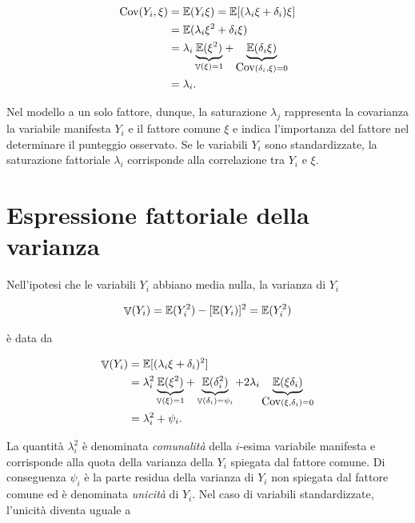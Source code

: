 \documentclass[
  11pt,
]{krantz}
\DeclareMathOperator{\V}{\mathbb{V}} %
\newcommand{\E}{\mathbb{E}} %
\theoremstyle{definition}
\theoremstyle{definition}
\theoremstyle{definition}
\theoremstyle{definition}
\theoremstyle{remark}
\begin{document}
\begin{equation}
\begin{aligned}
  \mbox{Cov}(Y_i,\xi) &= \E(Y_i \xi)=\E[(\lambda_i \xi + \delta_i) \xi]\notag\\
  &=\E(\lambda_i \xi^2 + \delta_i \xi)\notag\\
  &=\lambda_i\underbrace{\E(\xi^2)}_{\V(\xi)=1} + \underbrace{\E(\delta_i \xi)}_{\mbox{Cov}(\delta_i, \xi)=0}\notag\\
  &= \lambda_i.\notag
\end{aligned}
\end{equation}

Nel modello a un solo fattore, dunque, la saturazione \(\lambda_j\) rappresenta la covarianza la variabile manifesta \(Y_i\) e il fattore comune \(\xi\) e indica l'importanza del fattore nel determinare il punteggio osservato. Se le variabili \(Y_i\) sono standardizzate, la saturazione fattoriale \(\lambda_i\) corrisponde alla correlazione tra \(Y_i\) e \(\xi\).

\hypertarget{espressione-fattoriale-della-varianza}{%
\section{Espressione fattoriale della varianza}\label{espressione-fattoriale-della-varianza}}

Nell'ipotesi che le variabili \(Y_i\) abbiano media nulla, la varianza di \(Y_i\)

\begin{equation}
  \V(Y_i) = \E(Y_i^2) -[\E(Y_i)]^2 = \E(Y_i^2)\notag
\end{equation}

è data da

\begin{equation}
\begin{aligned}
  \V(Y_i) &= \E[(\lambda_i \xi + \delta_i)^2 ]\notag\\
  &=\lambda_i^2 \underbrace{\E(\xi^2) }_{\V(\xi)=1} + \underbrace{ \E(\delta_i^2) }_{\V(\delta_i)=\psi_{i}} + 2\lambda_i \underbrace{ \E(\xi \delta_i) }_{\mbox{Cov}(\xi, \delta_{i})=0}\notag\\
  &=\lambda^2_i + \psi_{i}.
\end{aligned}
\end{equation}

La quantità \(\lambda^2_i\) è denominata \emph{comunalità} della \(i\)-esima variabile manifesta e corrisponde alla quota della varianza della \(Y_i\) spiegata dal fattore comune. Di conseguenza \(\psi_{i}\) è la parte residua della varianza di \(Y_i\) non spiegata dal fattore comune ed è denominata \emph{unicità} di \(Y_i\). Nel caso di variabili standardizzate, l'unicità diventa uguale a
\end{document}
